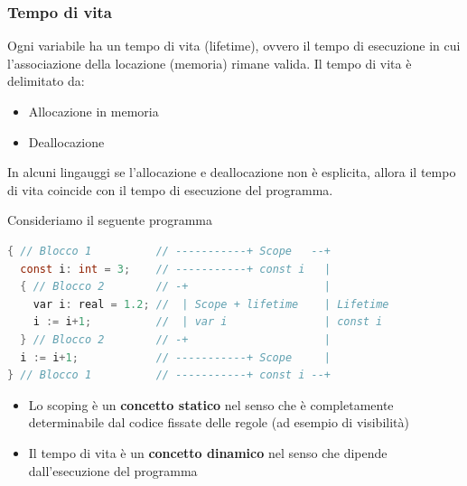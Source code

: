 \documentclass[a4paper]{article}
\begin{document}
\subsubsection{Tempo di vita}
Ogni variabile ha un tempo di vita (lifetime), ovvero il tempo di esecuzione in cui
l'associazione della locazione (memoria) rimane valida. Il tempo di vita è delimitato
da:
\begin{itemize}
  \item Allocazione in memoria
  \item Deallocazione
\end{itemize}
In alcuni lingauggi se l'allocazione e deallocazione non è esplicita, allora il
tempo di vita coincide con il tempo di esecuzione del programma.
\begin{example}
  Consideriamo il seguente programma
\begin{lstlisting}[language=C]
{ // Blocco 1          // -----------+ Scope   --+
  const i: int = 3;    // -----------+ const i   |
  { // Blocco 2        // -+                     |
    var i: real = 1.2; //  | Scope + lifetime    | Lifetime
    i := i+1;          //  | var i               | const i
  } // Blocco 2        // -+                     |
  i := i+1;            // -----------+ Scope     |
} // Blocco 1          // -----------+ const i --+
\end{lstlisting}
\end{example}

\noindent
\begin{itemize}
  \item Lo scoping è un \textbf{concetto statico} nel senso che è completamente
    determinabile dal codice fissate delle regole (ad esempio di visibilità)

  \item Il tempo di vita è un \textbf{concetto dinamico} nel senso che dipende
    dall'esecuzione del programma
\end{itemize}
\end{document}

